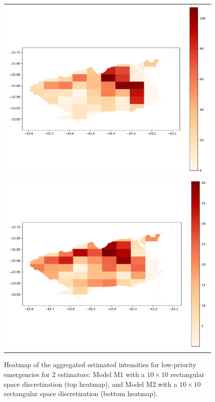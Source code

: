 \documentclass[article]{jss}
\begin{document}
\begin{figure}
\centering
\begin{tabular}{c}
\includegraphics[scale=0.5]{heatP3Rect10x10_v3.pdf}\\
\includegraphics[scale=0.5]{heatCovP3Rect10x10_v3.pdf}
\end{tabular}
\caption{Heatmap of the aggregated estimated intensities for low-priority emergencies for 2 estimators: Model M1 with a $10 \times 10$ rectangular space discretization (top heatmap), and Model M2 with a $10 \times 10$ rectangular space discretization (bottom heatmap).
\label{fig:heatmap4}}
\end{figure}
\end{document}
